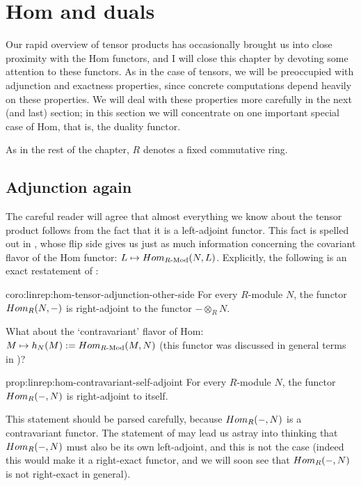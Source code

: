 \section{Hom and duals}
\label{sec:linrep:hom-and-duals}

Our rapid overview of tensor products has occasionally brought us into
close proximity with the Hom functors, and I will close this chapter
by devoting some attention to these functors. As in the case of
tensors, we will be preoccupied with adjunction and exactness
properties, since concrete computations depend heavily on these
properties. We will deal with these properties more carefully in the
next (and last) section; in this section we will concentrate on one
important special case of Hom, that is, the duality functor.

As in the rest of the chapter, $R$ denotes a fixed commutative ring.

\subsection{Adjunction again}
\label{subsec:linrep:adjunction-again}
The careful reader will agree that almost everything we know about the
tensor product follows from the fact that it is a left-adjoint
functor.  This fact is spelled out in , whose
flip side gives us just as much information concerning the covariant
flavor of the Hom functor: $L \mapsto Hom_{R\text{-Mod}}(N, L)$.
Explicitly, the following is an exact restatement of
:

\begin{coro}{}{coro:linrep:hom-tensor-adjunction-other-side}
  For every $R$-module $N$, the functor $Hom_R(N, -)$ is
  right-adjoint to the functor $- \otimes_R N$.
\end{coro}

What about the `contravariant' flavor of Hom:
$M \mapsto h_N(M) := Hom_{R\text{-Mod}}(M, N)$ (this functor was
discussed in general terms in
)?

\begin{prop}{}{prop:linrep:hom-contravariant-self-adjoint}
  For every $R$-module $N$, the functor $Hom_R(-, N)$ is
  right-adjoint to itself.
\end{prop}

This statement should be parsed carefully, because $Hom_R(-, N)$ is a
contravariant functor. The statement of 
may lead us astray into thinking that $Hom_R(-, N)$ must also be its
own left-adjoint, and this is not the case (indeed this would make it
a right-exact functor, and we will soon see that $Hom_R(-, N)$ is not
right-exact in general).

